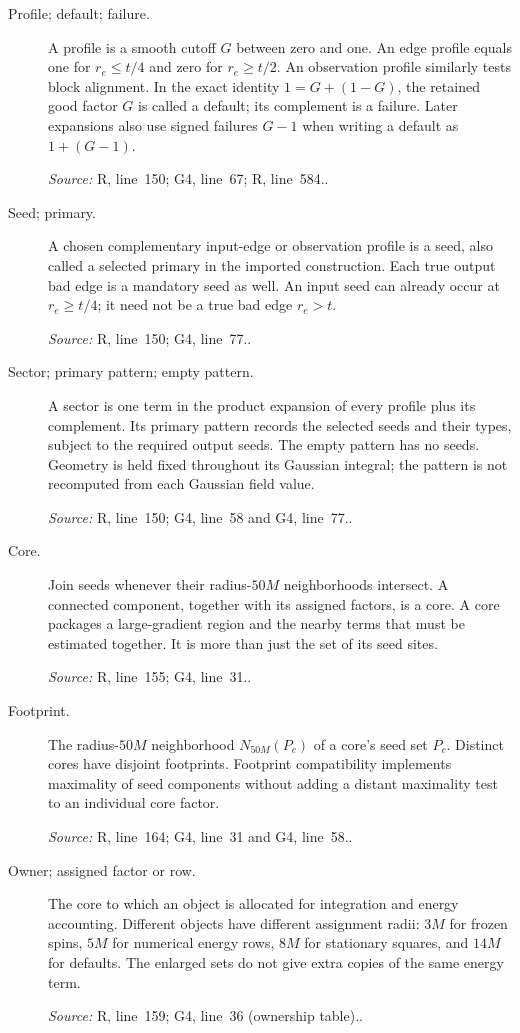 \documentclass[11pt]{article}
\newcommand{\src}[2]{\textsf{#1}, line~#2}
\newcommand{\where}[1]{\par{\small\textit{Source:} #1.}}
\begin{document}
\begin{description}
\item[Profile; default; failure.]
A profile is a smooth cutoff \(G\) between zero and one.  An edge
profile equals one for \(r_e\le t/4\) and zero for \(r_e\ge t/2\).
An observation profile similarly tests block alignment.  In the exact
identity \(1=G+(1-G)\), the retained good factor \(G\) is called a
default; its complement is a failure.  Later expansions also use signed
failures \(G-1\) when writing a default as \(1+(G-1)\).
\where{\src{R}{150}; \src{G4}{67}; \src{R}{584}.}

\item[Seed; primary.]
A chosen complementary input-edge or observation profile is a seed,
also called a selected primary in the imported construction.  Each
true output bad edge is a mandatory seed as well.  An input seed can
already occur at \(r_e\ge t/4\); it need not be a true bad edge
\(r_e>t\).
\where{\src{R}{150}; \src{G4}{77}.}

\item[Sector; primary pattern; empty pattern.]
A sector is one term in the product expansion of every profile plus
its complement.  Its primary pattern records the selected seeds and
their types, subject to the required output seeds.  The empty pattern
has no seeds.  Geometry is held fixed throughout its Gaussian integral;
the pattern is not recomputed from each Gaussian field value.
\where{\src{R}{150}; \src{G4}{58} and \src{G4}{77}.}

\item[Core.]
Join seeds whenever their radius-\(50M\) neighborhoods intersect.
A connected component, together with its assigned factors, is a core.
A core packages a large-gradient region and the nearby terms that
must be estimated together.  It is more than just the set of its seed
sites.
\where{\src{R}{155}; \src{G4}{31}.}

\item[Footprint.]
The radius-\(50M\) neighborhood \(N_{50M}(P_c)\) of a core's seed set
\(P_c\).  Distinct cores have disjoint footprints.  Footprint
compatibility implements maximality of seed components without adding
a distant maximality test to an individual core factor.
\where{\src{R}{164}; \src{G4}{31} and \src{G4}{58}.}

\item[Owner; assigned factor or row.]
The core to which an object is allocated for integration and energy
accounting.  Different objects have different assignment radii:
\(3M\) for frozen spins, \(5M\) for numerical energy rows,
\(8M\) for stationary squares, and \(14M\) for defaults.
The enlarged sets do not give extra copies of the same energy term.
\where{\src{R}{159}; \src{G4}{36} (ownership table).}


\end{description}
\end{document}
